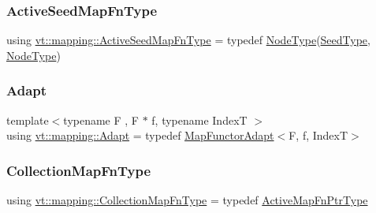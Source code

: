\mbox{\label{namespacevt_1_1mapping_ab9cfcd87eb3ff00e63478d0197056b7e}} 
\subsubsection{\texorpdfstring{Active\+Seed\+Map\+Fn\+Type}{ActiveSeedMapFnType}}
{\footnotesize\ttfamily using \hyperlink{namespacevt_1_1mapping_ab9cfcd87eb3ff00e63478d0197056b7e}{vt\+::mapping\+::\+Active\+Seed\+Map\+Fn\+Type} = typedef \hyperlink{namespacevt_a866da9d0efc19c0a1ce79e9e492f47e2}{Node\+Type}(\hyperlink{namespacevt_ae2e13198bdef4d5b8e603d6c1c7f0969}{Seed\+Type}, \hyperlink{namespacevt_a866da9d0efc19c0a1ce79e9e492f47e2}{Node\+Type})}

\mbox{\label{namespacevt_1_1mapping_aafe187035ce8df02f31983e37cdb6a5d}} 
\subsubsection{\texorpdfstring{Adapt}{Adapt}}
{\footnotesize\ttfamily template$<$typename F , F $\ast$ f, typename IndexT $>$ \\
using \hyperlink{namespacevt_1_1mapping_aafe187035ce8df02f31983e37cdb6a5d}{vt\+::mapping\+::\+Adapt} = typedef \hyperlink{namespacevt_1_1mapping_add4b5257a62b56d194f7e931b608f8f0}{Map\+Functor\+Adapt}$<$F, f, IndexT$>$}

\mbox{\label{namespacevt_1_1mapping_a2910ab582d95478603cdca7480af65b2}} 
\subsubsection{\texorpdfstring{Collection\+Map\+Fn\+Type}{CollectionMapFnType}}
{\footnotesize\ttfamily using \hyperlink{namespacevt_1_1mapping_a2910ab582d95478603cdca7480af65b2}{vt\+::mapping\+::\+Collection\+Map\+Fn\+Type} = typedef \hyperlink{namespacevt_1_1mapping_a748d5efb71ca5878288d5809f57d7254}{Active\+Map\+Fn\+Ptr\+Type}}

